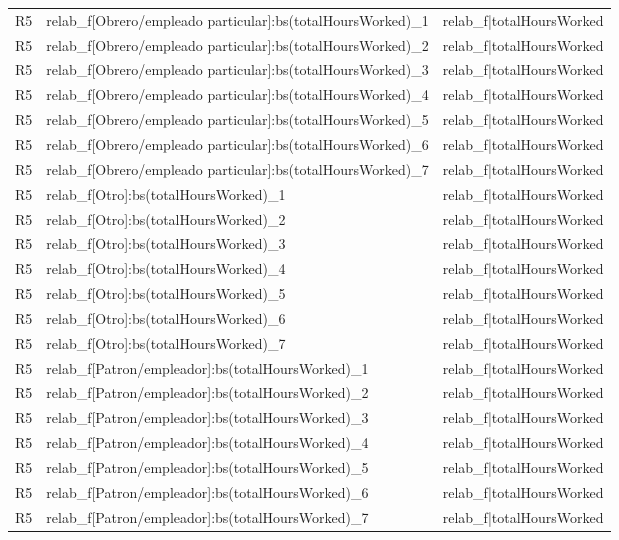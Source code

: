 \begin{longtable}{lll}
R5 & relab\_f[Obrero/empleado particular]:bs(totalHoursWorked)\_1 & relab\_f|totalHoursWorked \\
R5 & relab\_f[Obrero/empleado particular]:bs(totalHoursWorked)\_2 & relab\_f|totalHoursWorked \\
R5 & relab\_f[Obrero/empleado particular]:bs(totalHoursWorked)\_3 & relab\_f|totalHoursWorked \\
R5 & relab\_f[Obrero/empleado particular]:bs(totalHoursWorked)\_4 & relab\_f|totalHoursWorked \\
R5 & relab\_f[Obrero/empleado particular]:bs(totalHoursWorked)\_5 & relab\_f|totalHoursWorked \\
R5 & relab\_f[Obrero/empleado particular]:bs(totalHoursWorked)\_6 & relab\_f|totalHoursWorked \\
R5 & relab\_f[Obrero/empleado particular]:bs(totalHoursWorked)\_7 & relab\_f|totalHoursWorked \\
R5 & relab\_f[Otro]:bs(totalHoursWorked)\_1 & relab\_f|totalHoursWorked \\
R5 & relab\_f[Otro]:bs(totalHoursWorked)\_2 & relab\_f|totalHoursWorked \\
R5 & relab\_f[Otro]:bs(totalHoursWorked)\_3 & relab\_f|totalHoursWorked \\
R5 & relab\_f[Otro]:bs(totalHoursWorked)\_4 & relab\_f|totalHoursWorked \\
R5 & relab\_f[Otro]:bs(totalHoursWorked)\_5 & relab\_f|totalHoursWorked \\
R5 & relab\_f[Otro]:bs(totalHoursWorked)\_6 & relab\_f|totalHoursWorked \\
R5 & relab\_f[Otro]:bs(totalHoursWorked)\_7 & relab\_f|totalHoursWorked \\
R5 & relab\_f[Patron/empleador]:bs(totalHoursWorked)\_1 & relab\_f|totalHoursWorked \\
R5 & relab\_f[Patron/empleador]:bs(totalHoursWorked)\_2 & relab\_f|totalHoursWorked \\
R5 & relab\_f[Patron/empleador]:bs(totalHoursWorked)\_3 & relab\_f|totalHoursWorked \\
R5 & relab\_f[Patron/empleador]:bs(totalHoursWorked)\_4 & relab\_f|totalHoursWorked \\
R5 & relab\_f[Patron/empleador]:bs(totalHoursWorked)\_5 & relab\_f|totalHoursWorked \\
R5 & relab\_f[Patron/empleador]:bs(totalHoursWorked)\_6 & relab\_f|totalHoursWorked \\
R5 & relab\_f[Patron/empleador]:bs(totalHoursWorked)\_7 & relab\_f|totalHoursWorked \\

\end{longtable}

